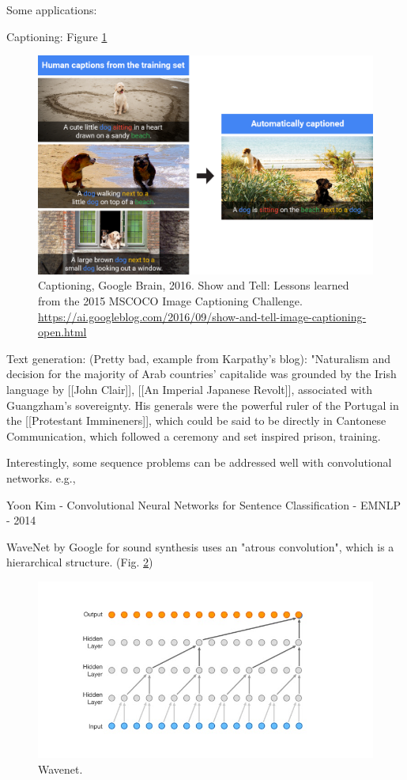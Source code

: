 \documentclass[english]{article}
\begin{document}
\item Some applications: 

Captioning: Figure \ref{c}

\begin{figure}
  \centering
  \includegraphics[scale=0.4]{Caption4.png}
    \caption{Captioning,  Google Brain, 2016. Show and Tell: Lessons learned from the 2015 MSCOCO Image Captioning Challenge. \url{https://ai.googleblog.com/2016/09/show-and-tell-image-captioning-open.html}}
    \label{c}
\end{figure}

Text generation: (Pretty bad, example from Karpathy's blog): "Naturalism and decision for the majority of Arab countries' capitalide was grounded
by the Irish language by [[John Clair]], [[An Imperial Japanese Revolt]], associated  with Guangzham's sovereignty. His generals were the powerful ruler of the Portugal 
in the [[Protestant Immineners]], which could be said to be directly in Cantonese 
Communication, which followed a ceremony and set inspired prison, training.

\item Interestingly, some sequence problems can be addressed well with convolutional networks. e.g., 

Yoon Kim - Convolutional Neural Networks for Sentence Classification - EMNLP - 2014

WaveNet by Google for sound synthesis uses an "atrous convolution", which is a hierarchical structure. (Fig. \ref{wavenet})

\begin{figure}
  \centering
  \includegraphics[scale=0.8]{wavenet.jpg}
    \caption{Wavenet.}
    \label{wavenet}
\end{figure}
\end{document}
